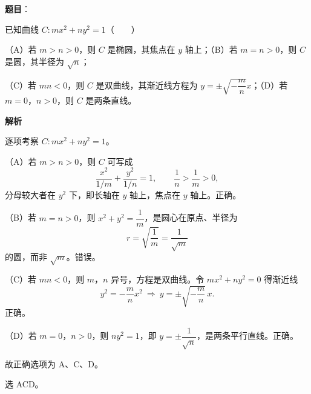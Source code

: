 \begin{answer}

\textbf{题目}：

已知曲线 $C:mx^2+ny^2=1$\mbox{（　　）}

（A）若 $m>n>0$，则 $C$ 是椭圆，其焦点在 $y$ 轴上；（B）若 $m=n>0$，则 $C$ 是圆，其半径为 $\sqrt n$；

（C）若 $mn<0$，则 $C$ 是双曲线，其渐近线方程为 $y=\pm\sqrt{-\dfrac mn}x$；（D）若 $m=0$，$n>0$，则 $C$ 是两条直线。

\textbf{解析}

逐项考察 $C:mx^2+ny^2=1$。

（A）若 $m>n>0$，则 $C$ 可写成
\nopagebreak[4]
\[\frac{x^2}{1/m}+\frac{y^2}{1/n}=1,\qquad \frac1n>\frac1m>0,\]
分母较大者在 $y^2$ 下，即长轴在 $y$ 轴上，焦点在 $y$ 轴上。正确。

（B）若 $m=n>0$，则 $x^2+y^2=\dfrac1m$，是圆心在原点、半径为
\nopagebreak[4]
\[r=\sqrt{\frac1m}=\frac1{\sqrt m}\]
的圆，而非 $\sqrt m$。错误。

（C）若 $mn<0$，则 $m$，$n$ 异号，方程是双曲线。令 $mx^2+ny^2=0$ 得渐近线
\nopagebreak[4]
\[y^2=-\frac mnx^2\ \Longrightarrow\ y=\pm\sqrt{-\frac mn}\,x .\]
正确。

（D）若 $m=0$，$n>0$，则 $ny^2=1$，即 $y=\pm\dfrac1{\sqrt n}$，是两条平行直线。正确。

故正确选项为 A、C、D。

选 ACD。


\end{answer}
